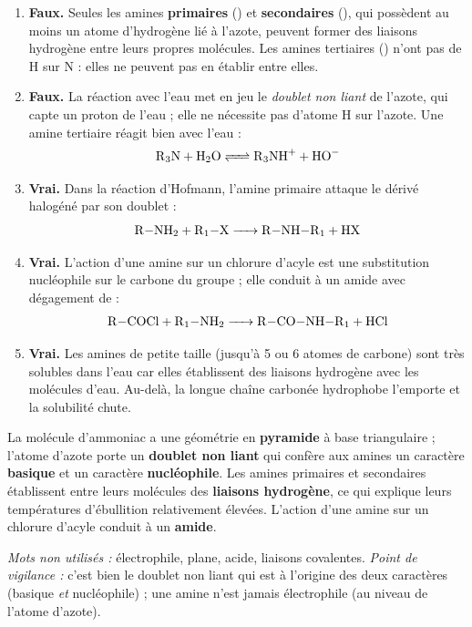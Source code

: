 \documentclass[11pt]{article}
\newcommand{\cle}[1]{{\popxbold\color{popdark}#1}}
\begin{document}
\begin{corrige}
\begin{enumerate}
\item \textbf{Faux.} Seules les amines \textbf{primaires} () et \textbf{secondaires} (), qui possèdent au moins un atome d'hydrogène lié à l'azote, peuvent former des liaisons hydrogène entre leurs propres molécules. Les amines tertiaires () n'ont pas de H sur N : elles ne peuvent pas en établir entre elles.
\item \textbf{Faux.} La réaction avec l'eau met en jeu le \emph{doublet non liant} de l'azote, qui capte un proton de l'eau ; elle ne nécessite pas d'atome H sur l'azote. Une amine tertiaire réagit bien avec l'eau : \[ \ce{R3N + H2O <=> R3NH+ + HO-} \]
\item \textbf{Vrai.} Dans la réaction d'Hofmann, l'amine primaire  attaque le dérivé halogéné  par son doublet : \[ \ce{R-NH2 + R1-X -> R-NH-R1 + HX} \]
\item \textbf{Vrai.} L'action d'une amine sur un chlorure d'acyle est une substitution nucléophile sur le carbone du groupe  ; elle conduit à un \cle{amide} avec dégagement de  : \[ \ce{R-COCl + R1-NH2 -> R-CO-NH-R1 + HCl} \]
\item \textbf{Vrai.} Les amines de petite taille (jusqu'à 5 ou 6 atomes de carbone) sont très solubles dans l'eau car elles établissent des liaisons hydrogène avec les molécules d'eau. Au-delà, la longue chaîne carbonée hydrophobe l'emporte et la solubilité chute.
\end{enumerate}
\end{corrige}

\begin{corrige}
La molécule d'ammoniac  a une géométrie en \textbf{pyramide} à base triangulaire ; l'atome d'azote porte un \textbf{doublet non liant} qui confère aux amines un caractère \textbf{basique} et un caractère \textbf{nucléophile}. Les amines primaires et secondaires établissent entre leurs molécules des \textbf{liaisons hydrogène}, ce qui explique leurs températures d'ébullition relativement élevées. L'action d'une amine sur un chlorure d'acyle conduit à un \textbf{amide}.
\medskip

\emph{Mots non utilisés :} électrophile, plane, acide, liaisons covalentes. \emph{Point de vigilance :} c'est bien le doublet non liant qui est à l'origine des deux caractères (basique \emph{et} nucléophile) ; une amine n'est jamais électrophile (au niveau de l'atome d'azote).
\end{corrige}
\end{document}
